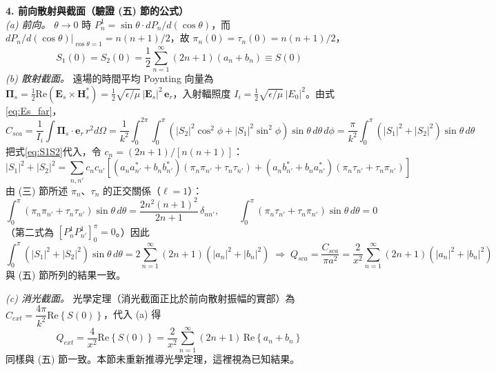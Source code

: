 \textbf{4. 前向散射與截面（驗證 (五) 節的公式）}\\
\textit{(a) 前向。} $\theta \to 0$ 時 $P_n^1 = \sin\theta \cdot dP_n/d\left(\cos\theta\right)$，而 $dP_n/d\left(\cos\theta\right)\big|_{\cos\theta=1} = n(n+1)/2$，故 $\pi_n(0) = \tau_n(0) = n(n+1)/2$，
\begin{equation}
    S_1(0) = S_2(0) = \frac{1}{2} \sum_{n=1}^{\infty} (2n+1)\left( a_n + b_n \right) \equiv S(0)
\end{equation}
\textit{(b) 散射截面。} 遠場的時間平均 Poynting 向量為 $\boldsymbol{\Pi}_s = \frac{1}{2} \mathrm{Re}\left( \mathbf{E}_s \times \mathbf{H}_s^* \right) = \frac{1}{2}\sqrt{\epsilon/\mu}\, |\mathbf{E}_s|^2\, \mathbf{e}_r$，入射輻照度 $I_i = \frac{1}{2}\sqrt{\epsilon/\mu}\, |E_0|^2$。由式\eqref{eq:Es_far}，
\begin{equation}
    C_{sca} = \frac{1}{I_i} \int \boldsymbol{\Pi}_s \cdot \mathbf{e}_r\, r^2 d\Omega = \frac{1}{k^2} \int_0^{2\pi}\!\!\int_0^{\pi} \left( |S_2|^2 \cos^2\phi + |S_1|^2 \sin^2\phi \right) \sin\theta\, d\theta\, d\phi = \frac{\pi}{k^2} \int_0^{\pi} \left( |S_1|^2 + |S_2|^2 \right) \sin\theta\, d\theta
\end{equation}
把式\eqref{eq:S1S2}代入，令 $c_n = (2n+1)/\left[n(n+1)\right]$：
\begin{equation}
    |S_1|^2 + |S_2|^2 = \sum_{n,n'} c_n c_{n'} \left[ \left( a_n a_{n'}^* + b_n b_{n'}^* \right)\left( \pi_n \pi_{n'} + \tau_n \tau_{n'} \right) + \left( a_n b_{n'}^* + b_n a_{n'}^* \right)\left( \pi_n \tau_{n'} + \tau_n \pi_{n'} \right) \right]
\end{equation}
由 (三) 節所述 $\pi_n$、$\tau_n$ 的正交關係（$\ell = 1$）\parencite{bohren1983Absorption}：
\begin{equation}
    \int_0^{\pi} \left( \pi_n \pi_{n'} + \tau_n \tau_{n'} \right) \sin\theta\, d\theta = \frac{2n^2(n+1)^2}{2n+1}\, \delta_{nn'}, \qquad \int_0^{\pi} \left( \pi_n \tau_{n'} + \tau_n \pi_{n'} \right) \sin\theta\, d\theta = 0
\end{equation}
（第二式為 $\left[ P_n^1 P_{n'}^1 \right]_0^{\pi} = 0$。）因此
\begin{equation}
    \int_0^{\pi} \left( |S_1|^2 + |S_2|^2 \right) \sin\theta\, d\theta = 2 \sum_{n=1}^{\infty} (2n+1) \left( |a_n|^2 + |b_n|^2 \right) \;\Rightarrow\; Q_{sca} = \frac{C_{sca}}{\pi a^2} = \frac{2}{x^2} \sum_{n=1}^{\infty} (2n+1) \left( |a_n|^2 + |b_n|^2 \right)
\end{equation}
與 (五) 節所列的結果一致。

\textit{(c) 消光截面。} 光學定理（消光截面正比於前向散射振幅的實部）為 $C_{ext} = \dfrac{4\pi}{k^2} \mathrm{Re}\left\{ S(0) \right\}$，代入 (a) 得
\begin{equation}
    Q_{ext} = \frac{4}{x^2} \mathrm{Re}\left\{ S(0) \right\} = \frac{2}{x^2} \sum_{n=1}^{\infty} (2n+1)\, \mathrm{Re}\left\{ a_n + b_n \right\}
\end{equation}
同樣與 (五) 節一致。本節未重新推導光學定理，這裡視為已知結果。


